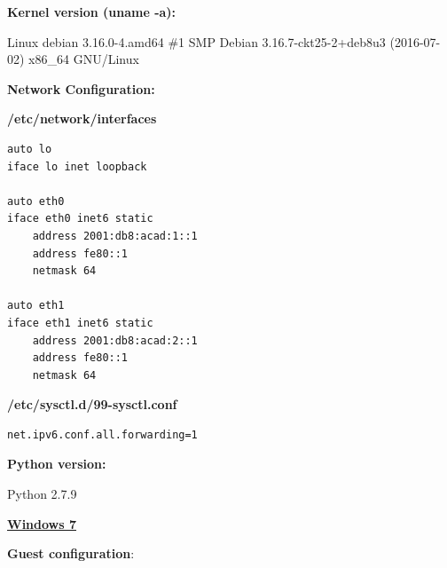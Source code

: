 \documentclass[12pt]{article}
\begin{document}
\textbf{Kernel version (uname -a):} 

\vspace{-10pt}
Linux debian 3.16.0-4.amd64 \#1 SMP Debian 3.16.7-ckt25-2+deb8u3 (2016-07-02) x86_64 GNU/Linux

\textbf{Network Configuration:}

\vspace{-10pt}
\textbf{/etc/network/interfaces}
\vspace{-5pt}
\begin{lstlisting}[style=python,basicstyle=\ttfamily\scriptsize]
auto lo
iface lo inet loopback

auto eth0
iface eth0 inet6 static
	address 2001:db8:acad:1::1
	address fe80::1
	netmask 64

auto eth1
iface eth1 inet6 static
	address 2001:db8:acad:2::1
	address fe80::1
	netmask 64
\end{lstlisting}

\vspace{-10pt}
\textbf{/etc/sysctl.d/99-sysctl.conf}

\vspace{-5pt}
\begin{lstlisting}[style=python,basicstyle=\ttfamily\scriptsize]
 net.ipv6.conf.all.forwarding=1
\end{lstlisting}

\vspace{-10pt}
\textbf{Python version:} 

\vspace{-10pt}
Python 2.7.9

\textbf{\underline{Windows 7}}

\vspace{-10pt}
\textbf{Guest configuration}:

\begin{savenotes}
\begin{table}[!htpb]
\centering
\addtolength{\tabcolsep}{1pt}
\noindent{}
\caption{Windows 7}
\label{table:windows7}
\end{table}
\end{savenotes}
\end{document}
